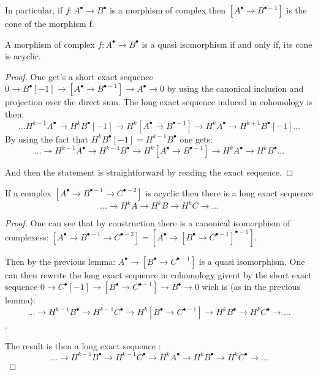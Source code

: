 \begin{remark}
    In particular, if $f:A^{\bullet}\to B^{\bullet}$ is a morphism of complex then $[A^{\bullet}\to B^{\bullet-1}]$ is the cone of the morphism f.
\end{remark}

\begin{lemma}\label{lem:q-iso_iff_cone_acyclic}
    A morphism of complex $f:A^{\bullet}\to B^{\bullet}$ is a quasi isomorphism if and only if, its cone is acyclic.
\end{lemma}

\begin{proof}
    One get's a short exact sequence $0\to B^{\bullet}[-1]\to [A^{\bullet}\to B^{\bullet-1}]\to A^{\bullet} \to 0$
    by using the canonical inclusion and projection over the direct sum. The long exact sequence induced in cohomology is then: \[\ldots H^{k-1}A^{\bullet} \to H^k B^{\bullet}[-1]\to H^k[A^{\bullet}\to B^{\bullet-1}]\to H^k A^{\bullet}\to H^{k+1}B^{\bullet}[-1]\ldots\]
    By using the fact that $H^k B^{\bullet}[-1]=H^{k-1}B^{\bullet}$ one gets:  \[\ldots\to  H^{k-1} A^{\bullet} \to H^{k-1} B^{\bullet}\to H^k[A^{\bullet}\to B^{\bullet-1}]\to H^k A^{\bullet}\to H^kB^{\bullet}\ldots\]

    And then the statement is straightforward by reading the exact sequence.
\end{proof}

\begin{lemma}\label{lem:complex_total_of_three_is_acyclic}
    If a complex $[A^{\bullet}\to B^{\bullet-1}\to C^{\bullet-2}]$ is acyclic then there is a long exact sequence \[\ldots \to H^k A\to H^k B\to H^k C\to \ldots\]
\end{lemma}

\begin{proof}
    One can see that by construction there is a canonical isomorphism of complexess: $[A^{\bullet}\to B^{\bullet-1}\to C^{\bullet-2}]=[A^{\bullet}\to [B^{\bullet}\to C^{\bullet-1}]^{\bullet-1}]$.

    Then by the previous lemma: $A^{\bullet}\to [B^{\bullet}\to C^{\bullet-1}]$ is a quasi isomorphism. One can then rewrite the long exact sequence in cohomology givent by the short exact sequence $0\to C^{\bullet}[-1]\to [B^{\bullet}\to C^{\bullet-1}]\to B^{\bullet} \to 0$ wich is (as in the previous lemma): \[\ldots\to  H^{k-1} B^{\bullet} \to H^{k-1} C^{\bullet}\to H^k[B^{\bullet}\to C^{\bullet-1}]\to H^k B^{\bullet}\to H^kC^{\bullet}\to \ldots\]. 

    The result is then a long exact sequence : \[\ldots\to  H^{k-1} B^{\bullet} \to H^{k-1} C^{\bullet}\to H^kA^{\bullet}\to H^k B^{\bullet}\to H^k C^{\bullet}\to\ldots\]

\end{proof}

